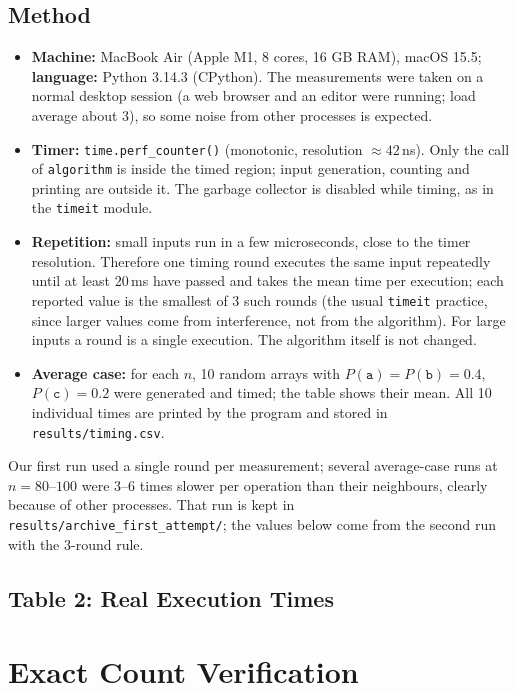 \documentclass[11pt]{article}
\theoremstyle{remark}
\newcommand{\ta}{\texttt{a}}
\newcommand{\tb}{\texttt{b}}
\newcommand{\tc}{\texttt{c}}
\begin{document}
\subsection{Method}
\begin{itemize}[nosep]
\item \textbf{Machine:} MacBook Air (Apple M1, 8 cores, 16 GB RAM), macOS 15.5; \textbf{language:} Python 3.14.3
(CPython). The measurements were taken on a normal desktop session (a web browser and an editor were running; load
average about 3), so some noise from other processes is expected.
\item \textbf{Timer:} \texttt{time.perf\_counter()} (monotonic, resolution $\approx 42$\,ns). Only the call of
\texttt{algorithm} is inside the timed region; input generation, counting and printing are outside it. The garbage
collector is disabled while timing, as in the \texttt{timeit} module.
\item \textbf{Repetition:} small inputs run in a few microseconds, close to the timer resolution. Therefore one timing
round executes the same input repeatedly until at least 20\,ms have passed and takes the mean time per execution;
each reported value is the smallest of 3 such rounds (the usual \texttt{timeit} practice, since larger values come
from interference, not from the algorithm). For large inputs a round is a single execution. The algorithm itself is
not changed.
\item \textbf{Average case:} for each $n$, 10 random arrays with $P(\ta)=P(\tb)=0.4$, $P(\tc)=0.2$ were generated
and timed; the table shows their mean. All 10 individual times are printed by the program and stored in
\texttt{results/timing.csv}.
\end{itemize}
Our first run used a single round per measurement; several average-case runs at $n=80$--$100$ were 3--6 times slower
per operation than their neighbours, clearly because of other processes. That run is kept in
\texttt{results/archive\_first\_attempt/}; the values below come from the second run with the 3-round rule.

\newpage
\subsection*{Table 2: Real Execution Times}


\section{Exact Count Verification}
\end{document}
